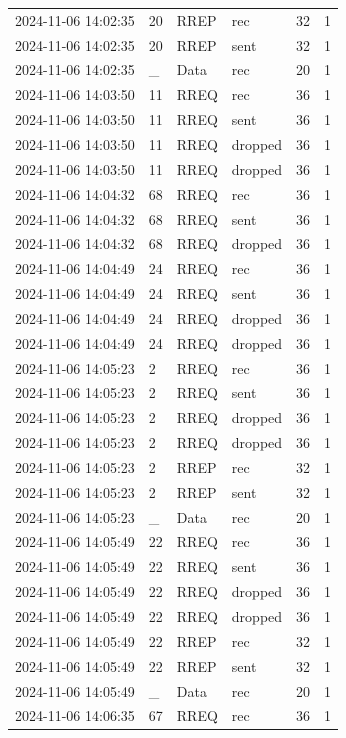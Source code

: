\documentclass[]{nsm-thesis}
\begin{document}
\begin{longtable}{llllll}
2024-11-06 14:02:35 & 20 & RREP & rec & 32 & 1 \\
2024-11-06 14:02:35 & 20 & RREP & sent & 32 & 1 \\
2024-11-06 14:02:35 & _ & Data & rec & 20 & 1 \\
2024-11-06 14:03:50 & 11 & RREQ & rec & 36 & 1 \\
2024-11-06 14:03:50 & 11 & RREQ & sent & 36 & 1 \\
2024-11-06 14:03:50 & 11 & RREQ & dropped & 36 & 1 \\
2024-11-06 14:03:50 & 11 & RREQ & dropped & 36 & 1 \\
2024-11-06 14:04:32 & 68 & RREQ & rec & 36 & 1 \\
2024-11-06 14:04:32 & 68 & RREQ & sent & 36 & 1 \\
2024-11-06 14:04:32 & 68 & RREQ & dropped & 36 & 1 \\
2024-11-06 14:04:49 & 24 & RREQ & rec & 36 & 1 \\
2024-11-06 14:04:49 & 24 & RREQ & sent & 36 & 1 \\
2024-11-06 14:04:49 & 24 & RREQ & dropped & 36 & 1 \\
2024-11-06 14:04:49 & 24 & RREQ & dropped & 36 & 1 \\
2024-11-06 14:05:23 & 2 & RREQ & rec & 36 & 1 \\
2024-11-06 14:05:23 & 2 & RREQ & sent & 36 & 1 \\
2024-11-06 14:05:23 & 2 & RREQ & dropped & 36 & 1 \\
2024-11-06 14:05:23 & 2 & RREQ & dropped & 36 & 1 \\
2024-11-06 14:05:23 & 2 & RREP & rec & 32 & 1 \\
2024-11-06 14:05:23 & 2 & RREP & sent & 32 & 1 \\
2024-11-06 14:05:23 & _ & Data & rec & 20 & 1 \\
2024-11-06 14:05:49 & 22 & RREQ & rec & 36 & 1 \\
2024-11-06 14:05:49 & 22 & RREQ & sent & 36 & 1 \\
2024-11-06 14:05:49 & 22 & RREQ & dropped & 36 & 1 \\
2024-11-06 14:05:49 & 22 & RREQ & dropped & 36 & 1 \\
2024-11-06 14:05:49 & 22 & RREP & rec & 32 & 1 \\
2024-11-06 14:05:49 & 22 & RREP & sent & 32 & 1 \\
2024-11-06 14:05:49 & _ & Data & rec & 20 & 1 \\
2024-11-06 14:06:35 & 67 & RREQ & rec & 36 & 1 \\

\end{longtable}
\end{document}
